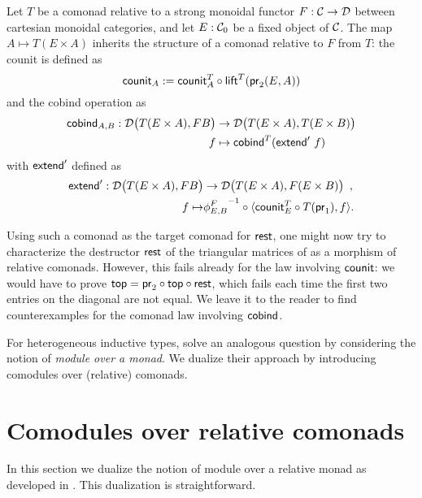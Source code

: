\documentclass[conference,10pt]{IEEEtran}
\begin{document}
\begin{definition}\label{product_comonad}
  Let $T$ be a comonad relative to a strong monoidal functor $F:\C\to\D$ between cartesian monoidal categories,
  and let $E:\C_0$ be a fixed object of $\C$.
 The map $A\mapsto T(E\times A)$ inherits the structure of a comonad relative to $F$ from $T$: the 
 counit is defined as
   \[ \counit_A := \comp{\lift^T(\pr_2(E,A))}{\counit^T_{A}} \]
  and the cobind operation as
   \begin{align*} 
            \cobind_{A,B} : \D\bigl(T(E\times A),FB\bigr) &\to \D\bigl(T(E\times A),T(E\times B)\bigr) \\
              f &\mapsto  \cobind^T(\extend'~f)
   \end{align*}
  with $\extend'$ defined as 
  \begin{align*} \extend' : \D\bigl(T(E\times A),FB\bigr) &\to \D\bigl(T(E\times A), F(E\times B)\bigr) \enspace , \\ 
                                            f  \mapsto &\comp{\langle \comp{T(\pr_1)}{\counit^T_E}, f \rangle}{{\phi^{F}_{E,B}}^{-1}}.
  \end{align*}
\end{definition}
 Using such a comonad as the target comonad for $\tail$, one might now 
 try to characterize the destructor $\tail$ of the triangular matrices of 
 as a morphism of relative comonads.
 However, this fails already for the law involving $\counit$: we would have to prove $\head = \comp{\tail}{\comp{\head}{\pr_2}}$,
 which fails each time the first two entries on the diagonal are not equal.
 We leave it to the reader to find counterexamples for the comonad law involving $\cobind$.

For heterogeneous inductive types, \textcite{DBLP:journals/iandc/HirschowitzM10} solve an analogous question by considering the notion of
\emph{module over a monad}. We  dualize their approach by introducing comodules over (relative) comonads.



\section{Comodules over relative comonads}\label{sec:comodules}

In this section we dualize the notion of module over a relative monad as developed in \parencite{ahrens_relmonads}.
This dualization is straightforward.
\end{document}
